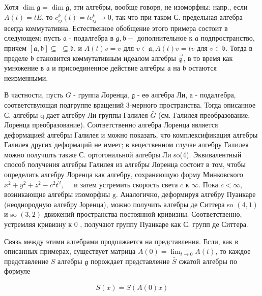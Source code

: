 \documentclass[10pt]{article}
\begin{document}
Хотя $\operatorname{dim} \mathfrak{g}=\operatorname{dim} \overline{\mathfrak{g}}$, эти алгебры, вообще говоря, не изоморфны: напр., если $A(t)=t E$, то $c_{i j}^{k}(t)=t c_{i j}^{k} \rightarrow 0$, так что при таком С. предельная алгебра всегда коммутативна. Естественное обобщение этого примера состоит в следующем: пусть $\mathfrak{a}$ - подалгебра в $\mathfrak{g}, \mathfrak{b}-$ дополнительное к $\mathfrak{a}$ подпространство, причем $[\mathfrak{a}, \mathfrak{b}] \subseteq$ $\subseteq \mathfrak{b}$, и $A(t) v=v$ для $v \in \mathfrak{a}, A(t) v=t v$ для $v \in \mathfrak{b}$. Тогда в пределе $\mathfrak{b}$ становится коммутативным идеалом алгебры $\overrightarrow{\mathfrak{g}}$, в то время как умножение в $\mathfrak{a}$ и присоединенное действие алгебры $\mathfrak{a}$ на $\mathfrak{b}$ остаются неизменными.



В частности, пусть $G$ - группа Лоренца, $\mathfrak{g}$ - еө алгебра Ли, а - подалгебра, соответствующая подгруппе вращений 3-мерного пространства. Тогда описанное С. алгебры q дает алгебру Ли группы Галилея $\bar{G}$ (см. Галилея преобразование, Лоренца преобразование). Соответственно алгебра Лоренца является деформацией алгебры Галилея и можно показать, что комплексификация алгебры Галилея других деформаций не имеет; в вецественном случае алгебру Галилея можно получшть также С. ортогональной алгебры Ли so(4). Эквивалентный способ получения алгебры Галилея из алгебры Лоренца состоит в том, чтобы определить алгебру Лоренца как алгебру, сохраняющую форму Минковского $x^{2}+y^{2}+z^{2}-c^{2} t^{2}, \quad$ и затем устремить скорость света $c$ к $\infty$. Пока $c<\infty$, возникающие алгебры изоморфны $\mathrm{g}$. Аналогично, деформируя алгебру Пуанкаре (неоднородную алгебру Јоренца), можно получить алгебры де Ситтера so $(4,1)$ и so $(3,2)$ движений пространства постоянной кривизны. Соответственно, устремляя кривизну к 0 , получают группу Пуанкаре как С. групп де Ситтера.



Связь между этими алгебрами продолжается на представления. Если, как в описанных примерах, существует матрица $A(0)=\lim _{t \rightarrow 0} A(t)$, то каждое представление $S$ алгебры $\mathfrak{g}$ порождает представление $\bar{S}$ сжатой алгебры по формуле



\[

\bar{S}(x)=S(A(0) x)

\]
\end{document}
